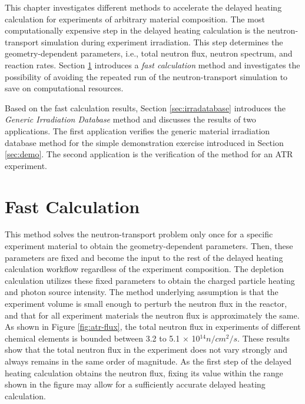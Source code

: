 \label{ch:database}

This chapter investigates different methods to accelerate the delayed heating calculation for experiments of arbitrary material composition.
The most computationally expensive step in the delayed heating calculation is the neutron-transport simulation during experiment irradiation.
This step determines the geometry-dependent parameters, i.e., total neutron flux, neutron spectrum, and reaction rates.
Section \ref{sec:fast} introduces a \textit{fast calculation} method and investigates the possibility of avoiding the repeated run of the neutron-transport simulation to save on computational resources.

Based on the fast calculation results, Section \ref{sec:irradatabase} introduces the \textit{Generic Irradiation Database} method and discusses the results of two applications.
The first application verifies the generic material irradiation database method for the simple demonstration exercise introduced in Section \ref{sec:demo}.
The second application is the verification of the method for an ATR experiment.

\section{Fast Calculation}
\label{sec:fast}

This method solves the neutron-transport problem only once for a specific experiment material to obtain the geometry-dependent parameters.
Then, these parameters are fixed and become the input to the rest of the delayed heating calculation workflow regardless of the experiment composition.
The depletion calculation utilizes these fixed parameters to obtain the charged particle heating and photon source intensity.
The method underlying assumption is that the experiment volume is small enough to perturb the neutron flux in the reactor, and that for all experiment materials the neutron flux is approximately the same.
As shown in Figure \ref{fig:atr-flux}, the total neutron flux in experiments of different chemical elements is bounded between 3.2 to 5.1 $\times$ 10$^{14} n/cm^2/s$.
These results show that the total neutron flux in the experiment does not vary strongly and always remains in the same order of magnitude.
As the first step of the delayed heating calculation obtains the neutron flux, fixing its value within the range shown in the figure may allow for a sufficiently accurate delayed heating calculation.


